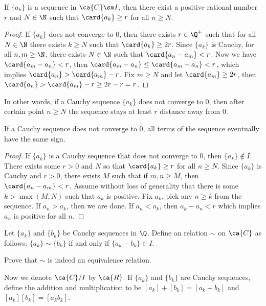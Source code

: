 \documentclass[10pt]{article}
\begin{document}
\begin{proposition}
    If $\{{a}_{k}\}$ is a sequence in $\ca{C}\sm I$, then there exist a positive rational number $r$ and $N\in\N$ such that $\card{{a}_{k}}\ge r$ for all $n\ge N$.
\end{proposition}
\begin{proof}
    If $\{{a}_{k}\}$ does not converge to 0, then there exists $r\in{\Q}^{+}$ such that for all $N\in\N$ there exists $k\ge N$ such that $\card{{a}_{k}}\ge 2r$. Since $\{{a}_{k}\}$ is Cauchy, for all $n,m\ge\N$, there exists $N\in\N$ such that $\card{{a}_{n}-{a}_{m}}<r$. Now we have $\card{{a}_{m}-{a}_{n}}<r$, then $\card{{a}_{m}-{a}_{n}}\le\card{{a}_{m}-{a}_{n}}<r$, which implies $\card{{a}_{n}}>\card{{a}_{m}}-r$. Fix $m\ge N$ and let $\card{{a}_{m}}\ge 2r$, then $\card{{a}_{n}}>\card{{a}_{m}}-r\ge 2r-r=r$.
\end{proof}
\par
In other words, if a Cauchy sequence $\{{a}_{k}\}$ does not converge to 0, then after certain point $n\ge N$ the sequence stays at least $r$ distance away from 0.
\begin{proposition}
    If a Cauchy sequence does not converge to 0, all terms of the sequence eventually have the same sign.
\end{proposition}
\begin{proof}
    If $\{{a}_{k}\}$ is a Cauchy sequence that does not converge to 0, then $\{{a}_{k}\}\notin I$. There exists some $r>0$ and $N$ so that $\card{{a}_{k}}\ge r$ for all $n\ge N$. Since $\{{a}_{k}\}$ is Cauchy and $r>0$, there exists $M$ such that if $m,n\ge M$, then $\card{{a}_{n}-{a}_{m}}< r$. Assume without loss of generality that there is some $k>\max(M,N)$ such that ${a}_{k}$ is positive. Fix ${a}_{k}$, pick any $n\ge k$ from the sequence. If ${a}_{n}>{a}_{k}$, then we are done. If ${a}_{n}<{a}_{k}$, then ${a}_{k}-{a}_{n}<r$ which implies ${a}_{n}$ is positive for all $n$.
\end{proof}
\par
Let $\{{a}_{k}\}$ and $\{{b}_{k}\}$ be Cauchy sequences in $\Q$. Define an relation $\sim$ on $\ca{C}$ as follows: $\{{a}_{k}\}\sim\{{b}_{k}\}$ if and only if $\{{a}_{k}-{b}_{k}\}\in I$. 
\begin{problem}
    Prove that $\sim$ is indeed an equivalence relation.
\end{problem}
\par
Now we denote $\ca{C}/I$ by $\ca{R}$. If $\{{a}_{k}\}$ and $\{{b}_{k}\}$ are Cauchy sequences, define the addition and multiplication to be $[{a}_{k}]+[{b}_{k}]=[{a}_{k}+{b}_{k}]$ and $[{a}_{k}][{b}_{k}]=[{a}_{k}{b}_{k}]$.
\end{document}
